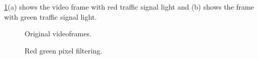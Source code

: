 \ref{f:org_img}(a) shows the video frame with red traffic signal light and (b) shows the frame with green traffic signal light.
\begin{figure}[!ht]
\centering
{}
\caption{Original videoframes.}
\label{f:org_img}
\end{figure}



\begin{figure}[!ht]
\centering
{}
\caption{Red green pixel filtering.}
\label{f:fil_img}
\end{figure}


